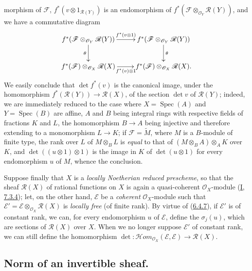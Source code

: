 \begin{env}[6.4.9]
morphism of $\mathcal{F}$,
$f^*(v\otimes1_{\mathcal{R}(Y)})$ is an endomorphism of
$f^*(\mathcal{F}\otimes_{\mathcal{O}_Y}\mathcal{R}(Y))$, and we have a
commutative diagram
\[
\xymatrix{
f^*(\mathcal{F}\otimes_{\mathcal{O}_Y}\mathcal{R}(Y))
  \ar[r]^{f^*(v\otimes1)}\ar[d]_{\theta}
& f^*(\mathcal{F}\otimes_{\mathcal{O}_Y}\mathcal{R}(Y))\ar[d]^{\theta}\\
f^*(\mathcal{F})\otimes_{\mathcal{O}_X}\mathcal{R}(X)
  \ar[r]_{f^*(v)\otimes1}
& f^*(\mathcal{F})\otimes_{\mathcal{O}_X}\mathcal{R}(X).
}
\]
We easily conclude that $\det f^*(v)$ is the canonical image, under the
homomorphism $f^*(\mathcal{R}(Y))\to\mathcal{R}(X)$, of the section
$\det v$ of $\mathcal{R}(Y)$; indeed, we are immediately reduced to the case
where $X=\operatorname{Spec}(A)$ and $Y=\operatorname{Spec}(B)$ are affine,
$A$ and $B$ being integral rings with respective fields of fractions $K$ and
$L$, the homomorphism $B\to A$ being injective and therefore extending to a
monomorphism $L\to K$; if $\mathcal{F}=\widetilde{M}$, where $M$ is a
$B$-module of finite type, the rank over $L$ of $M\otimes_B L$ is
\emph{equal} to that of $(M\otimes_B A)\otimes_A K$ over $K$, and
$\det((u\otimes1)\otimes1)$ is the image in $K$ of $\det(u\otimes1)$ for
every endomorphism $u$ of $M$, whence the conclusion.
\end{env}

\begin{env}[6.4.10]
\label{II.6.4.10}
Suppose finally that $X$ is a \emph{locally Noetherian reduced prescheme},
so that the sheaf $\mathcal{R}(X)$ of rational functions on $X$ is again a
quasi-coherent $\mathcal{O}_X$-module
(\hyperref[I.7.3.4]{I, 7.3.4}); let, on the other hand, $\mathcal{E}$ be a
\emph{coherent} $\mathcal{O}_X$-module such that
$\mathcal{E}'=\mathcal{E}\otimes_{\mathcal{O}_X}\mathcal{R}(X)$ is
\emph{locally free} (of finite rank). By virtue of
(\hyperref[II.6.4.7]{6.4.7}), if $\mathcal{E}'$ is of constant rank, we
can, for every endomorphism $u$ of $\mathcal{E}$, define the $\sigma_j(u)$,
which are sections of $\mathcal{R}(X)$ over $X$. When we no longer suppose
$\mathcal{E}'$ of constant rank, we can still define the homomorphism
$\det:\mathcal{H}om_{\mathcal{O}_X}(\mathcal{E},\mathcal{E})
\to\mathcal{R}(X)$.
\end{env}

\subsection{Norm of an invertible sheaf.}
\label{subsection:II.6.5}

